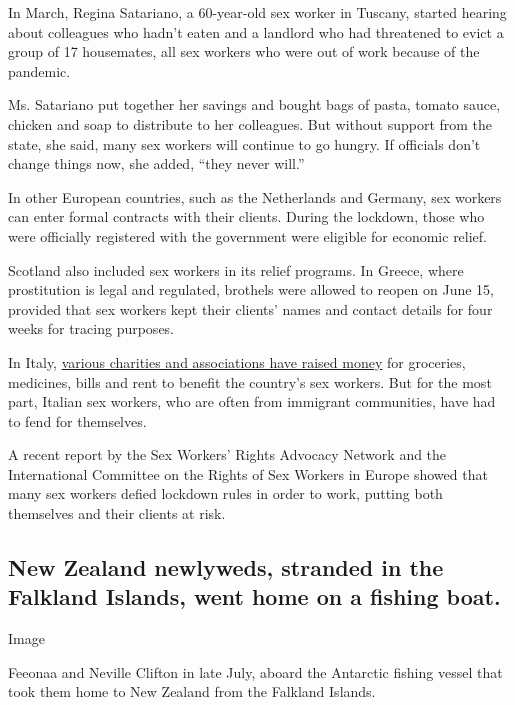 In March, Regina Satariano, a 60-year-old sex worker in Tuscany, started
hearing about colleagues who hadn't eaten and a landlord who had
threatened to evict a group of 17 housemates, all sex workers who were
out of work because of the pandemic.

Ms. Satariano put together her savings and bought bags of pasta, tomato
sauce, chicken and soap to distribute to her colleagues. But without
support from the state, she said, many sex workers will continue to go
hungry. If officials don't change things now, she added, ``they never
will.''

In other European countries, such as the Netherlands and Germany, sex
workers can enter formal contracts with their clients. During the
lockdown, those who were officially registered with the government were
eligible for economic relief.

Scotland also included sex workers in its relief programs. In Greece,
where prostitution is legal and regulated, brothels were allowed to
reopen on June 15, provided that sex workers kept their clients' names
and contact details for four weeks for tracing purposes.

In Italy,
\href{https://www.produzionidalbasso.com/project/covid19-nessuna-da-sola-solidarieta-immediata-alle-lavoratrici-sessuali-piu-colpite-dall-emergenza/}{various
charities and associations have raised money} for groceries, medicines,
bills and rent to benefit the country's sex workers. But for the most
part, Italian sex workers, who are often from immigrant communities,
have had to fend for themselves.

A recent report by the Sex Workers' Rights Advocacy Network and the
International Committee on the Rights of Sex Workers in Europe showed
that many sex workers defied lockdown rules in order to work, putting
both themselves and their clients at risk.

\hypertarget{new-zealand-newlyweds-stranded-in-the-falkland-islands-went-home-on-a-fishing-boat}{%
\subsection{New Zealand newlyweds, stranded in the Falkland Islands,
went home on a fishing
boat.}\label{new-zealand-newlyweds-stranded-in-the-falkland-islands-went-home-on-a-fishing-boat}}

Image

Feeonaa and Neville Clifton in late July, aboard the Antarctic fishing
vessel that took them home to New Zealand from the Falkland Islands.

